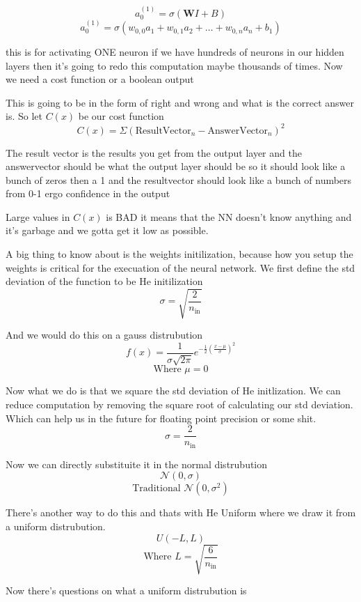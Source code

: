 \documentclass{article}
\begin{document}
$$a_0^{(1)}=\sigma(\mathbf{W}I+B)$$
$$ a_0^{(1)} = \sigma(w_{0,0}a_{1} + w_{0,1}a_{2} + \dots + w_{0,n}a_{n} +b_{1})$$
\par{this is for activating ONE neuron if we have hundreds of neurons in our hidden layers
then it's going to redo this computation maybe thousands of times. Now we need a cost function or a boolean output}
\\
\par{This is going to be in the form of right and wrong and what is the correct answer is. So let $C(x)$ be our cost function}
$$C(x) = \Sigma(\text{ResultVector}_n - \text{AnswerVector}_n)^2$$
\par{The result vector is the results you get from the output layer and the answervector should be what the output layer should be so it should look like
a bunch of zeros then a 1 and the resultvector should look like a bunch of numbers from 0-1 ergo confidence in the output}
\\
\par{Large values in $C(x)$ is BAD it means that the NN doesn't know anything and it's garbage and we gotta get it low as possible.}
\\
\par{A big thing to know about is the weights initilization,
because how you setup the weights is critical for the execuation of the neural network. We first define the std deviation of the function to be He initilization}
$$\sigma = \sqrt{\frac{2}{n_\text{in}}}$$
\par{And we would do this on a gauss distrubution}
$$f(x)=\frac{1}{\sigma\sqrt{2\pi}}e^{-\frac{1}{2}(\frac{x-\mu}{\sigma})^2}$$
$$\text{Where } \mu = 0$$
\par{Now what we do is that we square the std deviation of He initlization.
We can reduce computation by removing the square root of calculating our std deviation.
Which can help us in the future for floating point precision or some shit.}
$$\sigma = \frac{2}{n_\text{in}}$$
\par{Now we can directly substituite it in the normal distrubution}
$$\mathcal{N}(0,\sigma)$$
$$\text{Traditional } \mathcal{N}(0,\sigma^2)$$
\par{There's another way to do this and thats with He Uniform where we draw it from a uniform distrubution.}
$$U(-L,L)$$
$$\text{Where }L = \sqrt{\frac{6}{n_\text{in}}}$$
\par{Now there's questions on what a uniform distrubution is}
\end{document}
